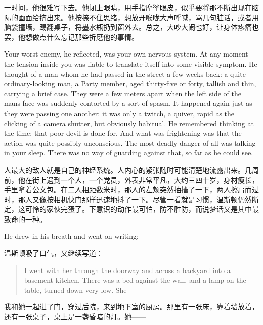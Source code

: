 \begin{paracol}{2}
\switchcolumn

一时间，他很难写下去。他闭上眼睛，用手指摩挲眼皮，似乎要将那不断出现在脑际的画面给挤出来。他按捺不住思绪，想放开喉咙大声呼喊，骂几句脏话，或者用脑袋撞墙，踢翻桌子，将墨水瓶扔到窗外去。总之，大吵大闹也好，让身体疼痛也罢，他想做点什么忘记那些折磨他的事情。

\switchcolumn*

Your worst enemy, he reflected, was your own nervous system. At any
moment the tension inside you was liable to translate itself into some
visible symptom. He thought of a man whom he had passed in the street a
few weeks back: a quite ordinary-looking man, a Party member, aged
thirty-five or forty, tallish and thin, carrying a brief case. They were
a few meters apart when the left side of the man\textquotesingle s face
was suddenly contorted by a sort of spasm. It happened again just as
they were passing one another: it was only a twitch, a quiver, rapid as
the clicking of a camera shutter, but obviously habitual. He remembered
thinking at the time: that poor devil is done for. And what was
frightening was that the action was quite possibly unconscious. The most
deadly danger of all was talking in your sleep. There was no way of
guarding against that, so far as he could see.

\switchcolumn

人最大的敌人就是自己的神经系统。人内心的紧张随时可能清楚地流露出来。几周前，他在街上遇到一个人，一个党员，外表非常平凡，大约三四十岁，身材瘦长，手里拿着公文包。在二人相距数米时，那人的左颊突然抽搐了一下，两人擦肩而过时，那人又像按相机快门那样迅速地抖了一下。尽管一看就是习惯，温斯顿仍然断定，这可怜的家伙完蛋了。下意识的动作最可怕，防不胜防，而说梦话又是其中最致命的一种。

\switchcolumn*

He drew in his breath and went on writing:

\switchcolumn

温斯顿吸了口气，又继续写道：

\switchcolumn*

\begin{quotation}
I went with her through the doorway and across a backyard into a
basement kitchen. There was a bed against the wall, and a lamp on the
table, turned down very low. She---
\end{quotation}

\switchcolumn

我和她一起进了门，穿过后院，来到地下室的厨房。那里有一张床，靠着墙放着，还有一张桌子，桌上是一盏昏暗的灯。她——


\end{paracol}
